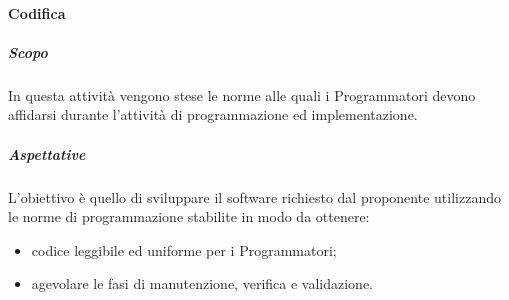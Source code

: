 			\paragraph{Codifica}
				\subparagraph{Scopo}	
					In questa attività vengono stese le norme alle quali i Programmatori devono affidarsi durante l’attività di  programmazione ed implementazione.
				\subparagraph{Aspettative}
					 L’obiettivo è quello di sviluppare il software richiesto dal proponente utilizzando le norme di programmazione stabilite in modo da ottenere:
					 	\begin{itemize}
					 	\item codice leggibile ed uniforme per i Programmatori;
					 	\item agevolare le fasi di manutenzione, verifica e validazione.
					 \end{itemize} 
%					
%				 
